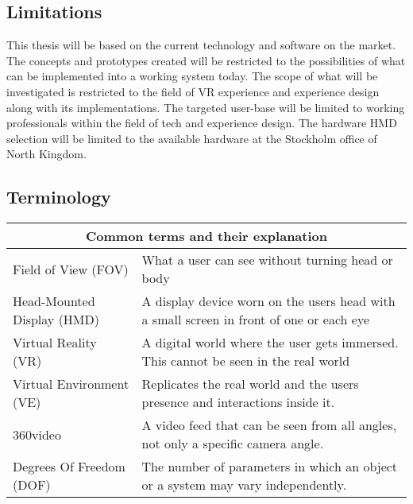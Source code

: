 \subsection{Limitations}
This thesis will be based on the current technology and software on the market. The concepts and prototypes created will be restricted to the possibilities of what can be implemented into a working system today. The scope of what will be investigated is restricted to the field of VR experience and experience design along with its implementations. The targeted user-base will be limited to working professionals within the field of tech and experience design. The hardware HMD selection will be limited to the available hardware at the Stockholm office of North Kingdom.

\subsection{Terminology}
\begin{tabular}{ | p{5.5cm} | p{6.5cm} |  }
	\hline
     	\multicolumn{2}{|c|}{Common terms and their explanation} \\
     	\hline
	Field of View (FOV) & What a user can see without turning head or body \\
    	\hline
     	Head-Mounted Display (HMD) & A display device worn on the users head with a small screen in front of one or each eye \\
    	\hline
     	Virtual Reality (VR) & A digital world where the user gets immersed. This cannot be seen in the real world
			\\
    	\hline
	Virtual Environment (VE) & Replicates the real world and the users presence and interactions inside it.  \\
     	\hline
     	360\degree video & A video feed that can be seen from all angles, not only a specific camera angle. \\
     	\hline
Degrees Of Freedom (DOF) & The number of parameters in which an object or a system may vary independently. \\
\hline
\end{tabular}
